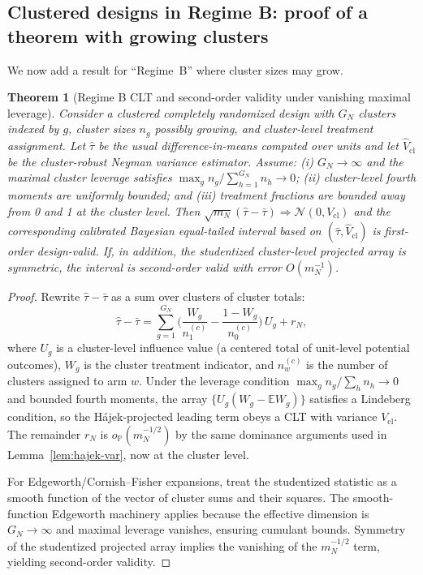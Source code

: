 \documentclass[aos]{imsart}
\newtheorem{theorem}{Theorem}
\theoremstyle{definition}
\theoremstyle{plain}
\begin{document}
\subsection{Clustered designs in Regime B: proof of a theorem with growing clusters}\label{app:clusterB}

We now add a result for ``Regime~B'' where cluster sizes may grow.

\begin{theorem}[Regime B CLT and second-order validity under vanishing maximal leverage]\label{thm:clusterB-proof}
Consider a clustered completely randomized design with $G_N$ clusters indexed by $g$, cluster sizes $n_g$ possibly growing, and
cluster-level treatment assignment.
Let $\hat\tau$ be the usual difference-in-means computed over units and let $\hat V_\mathrm{cl}$ be the cluster-robust Neyman variance estimator.
Assume:
(i) $G_N\to\infty$ and the maximal cluster leverage satisfies $\max_g n_g/\sum_{h=1}^{G_N} n_h \to 0$;
(ii) cluster-level fourth moments are uniformly bounded; and
(iii) treatment fractions are bounded away from 0 and 1 at the cluster level.
Then $\sqrt{m_N}(\hat\tau-\bar\tau)\Rightarrow\mathcal N(0,V_\mathrm{cl})$ and the corresponding calibrated Bayesian equal-tailed interval based on
$(\hat\tau,\hat V_\mathrm{cl})$ is first-order design-valid. If, in addition, the studentized cluster-level projected array is symmetric,
the interval is second-order valid with error $O(m_N^{-1})$.
\end{theorem}

\begin{proof}
Rewrite $\hat\tau-\bar\tau$ as a sum over clusters of cluster totals:
\[
\hat\tau-\bar\tau=\sum_{g=1}^{G_N} \Big(\frac{W_g}{n_1^{(c)}}-\frac{1-W_g}{n_0^{(c)}}\Big)\,U_g + r_N,
\]
where $U_g$ is a cluster-level influence value (a centered total of unit-level potential outcomes), $W_g$ is the cluster treatment indicator,
and $n_w^{(c)}$ is the number of clusters assigned to arm $w$.
Under the leverage condition $\max_g n_g/\sum_h n_h\to 0$ and bounded fourth moments, the array $\{U_g(W_g-\mathbb EW_g)\}$ satisfies a Lindeberg condition,
so the Hájek-projected leading term obeys a CLT with variance $V_\mathrm{cl}$.
The remainder $r_N$ is $o_{\mathbb P}(m_N^{-1/2})$ by the same dominance arguments used in Lemma~\ref{lem:hajek-var}, now at the cluster level.

For Edgeworth/Cornish--Fisher expansions, treat the studentized statistic as a smooth function of the vector of cluster sums and their squares.
The smooth-function Edgeworth machinery applies because the effective dimension is $G_N\to\infty$ and maximal leverage vanishes, ensuring cumulant bounds.
Symmetry of the studentized projected array implies the vanishing of the $m_N^{-1/2}$ term, yielding second-order validity.
\end{proof}
\end{document}
